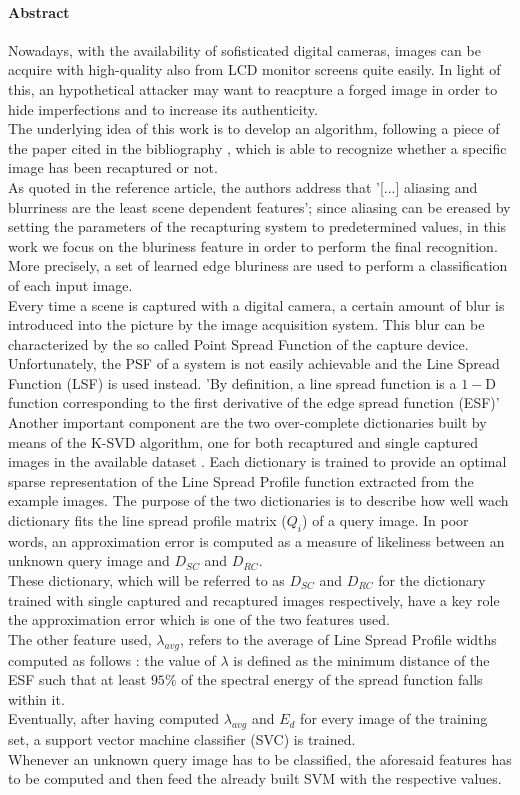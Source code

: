 \paragraph{Abstract}
Nowadays, with the availability of sofisticated digital cameras, images can be acquire with high-quality also from LCD monitor screens quite easily. In light of this, an hypothetical attacker may want to reacpture a forged image in order to hide imperfections and to increase its authenticity.\\
The underlying idea of this work is to develop an algorithm, following a piece of the paper cited in the bibliography \cite{paper}, which is able to recognize whether a specific image has been recaptured or not. \\
As quoted in the reference article, the authors address that '[...] aliasing and blurriness are the least scene dependent features'; since aliasing can be ereased by setting the parameters of the recapturing system to predetermined values, in this work we focus on the bluriness feature in order to perform the final recognition. More precisely, a set of learned edge bluriness are used to perform a classification of each input image.\\
Every time a scene is captured with a digital camera, a certain amount of blur is introduced into the picture by the image acquisition system. This blur can be characterized by the so called Point Spread Function of the capture device. Unfortunately, the PSF of a system is not easily achievable and the Line Spread Function (LSF) is used instead. 'By definition, a line spread function is a $1-$D function
corresponding to the first derivative of the edge spread function (ESF)' \cite{bluriness}\\
Another important component are the two over-complete dictionaries built by means of the K-SVD algorithm, one for both recaptured and single captured images in the available dataset \cite{database}. Each dictionary is trained to provide an optimal sparse representation of the Line Spread Profile function extracted from the example images. The purpose of the two dictionaries is to describe how well wach dictionary fits the line spread profile matrix ($Q_i$) of a query image. In poor words, an approximation error is computed as a measure of likeliness between an unknown query image and $D_{SC}$ and $D_{RC}$.\\
These dictionary, which will be referred to as $D_{SC}$ and $D_{RC}$ for the dictionary trained with single captured and recaptured images respectively, have a key role the approximation error which is one of the two features used.\\ The other feature used, $\lambda_{avg}$, refers to the average of Line Spread Profile widths computed as follows : the value of $\lambda$ is defined as the minimum distance of the ESF such that at least $95\%$ of the spectral energy of the spread function falls within it. \\
Eventually, after having computed $\lambda_{avg}$ and $E_d$ for every image of the training set, a support vector machine classifier (SVC) is trained.\\
Whenever an unknown query image has to be classified, the aforesaid features has to be computed and then feed the already built SVM with the respective values.